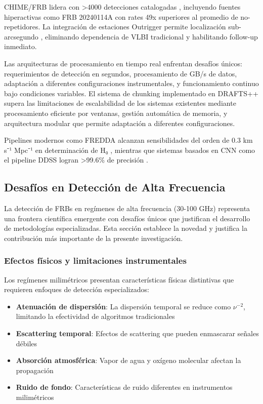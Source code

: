 CHIME/FRB lidera con >4000 detecciones catalogadas \cite{shin2025chimefrbdiscoveryextremelyactive}, incluyendo fuentes hiperactivas como FRB 20240114A con rates 49x superiores al promedio de no-repetidores. La integración de estaciones Outrigger permite localización sub-arcsegundo \cite{lanman2024chimefrboutriggerskkostation}, eliminando dependencia de VLBI tradicional y habilitando follow-up inmediato.

Las arquitecturas de procesamiento en tiempo real enfrentan desafíos únicos: requerimientos de detección en segundos, procesamiento de GB/s de datos, adaptación a diferentes configuraciones instrumentales, y funcionamiento continuo bajo condiciones variables. El sistema de chunking implementado en DRAFTS++ supera las limitaciones de escalabilidad de los sistemas existentes mediante procesamiento eficiente por ventanas, gestión automática de memoria, y arquitectura modular que permite adaptación a diferentes configuraciones.

Pipelines modernos como FREDDA alcanzan sensibilidades del orden de 0.3 km s⁻¹ Mpc⁻¹ en determinación de H₀ \cite{freda2025}, mientras que sistemas basados en CNN como el pipeline DDSS logran >99.6\% de precisión \cite{ddss2025}.

\subsection{Desafíos en Detección de Alta Frecuencia}

La detección de FRBs en regímenes de alta frecuencia (30-100 GHz) representa una frontera científica emergente con desafíos únicos que justifican el desarrollo de metodologías especializadas. Esta sección establece la novedad y justifica la contribución más importante de la presente investigación.

\subsubsection{Efectos físicos y limitaciones instrumentales}

Los regímenes milimétricos presentan características físicas distintivas que requieren enfoques de detección especializados:

\begin{itemize}
    \item \textbf{Atenuación de dispersión}: La dispersión temporal se reduce como $\nu^{-2}$, limitando la efectividad de algoritmos tradicionales
    \item \textbf{Escattering temporal}: Efectos de scattering que pueden enmascarar señales débiles
    \item \textbf{Absorción atmosférica}: Vapor de agua y oxígeno molecular afectan la propagación
    \item \textbf{Ruido de fondo}: Características de ruido diferentes en instrumentos milimétricos
\end{itemize}

